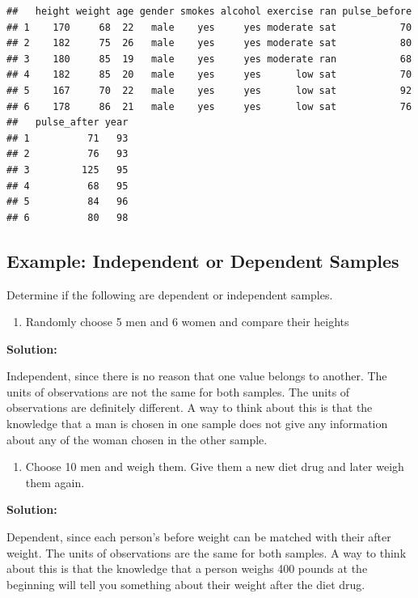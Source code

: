 \documentclass[]{book}
\providecommand{\tightlist}{%
  \setlength{\itemsep}{0pt}\setlength{\parskip}{0pt}}
\begin{document}
\begin{verbatim}
##   height weight age gender smokes alcohol exercise ran pulse_before
## 1    170     68  22   male    yes     yes moderate sat           70
## 2    182     75  26   male    yes     yes moderate sat           80
## 3    180     85  19   male    yes     yes moderate ran           68
## 4    182     85  20   male    yes     yes      low sat           70
## 5    167     70  22   male    yes     yes      low sat           92
## 6    178     86  21   male    yes     yes      low sat           76
##   pulse_after year
## 1          71   93
## 2          76   93
## 3         125   95
## 4          68   95
## 5          84   96
## 6          80   98
\end{verbatim}

\hypertarget{example-independent-or-dependent-samples}{%
\subsection{Example: Independent or Dependent Samples}\label{example-independent-or-dependent-samples}}

Determine if the following are dependent or independent samples.

\begin{enumerate}
\def\labelenumi{\alph{enumi}.}
\tightlist
\item
  Randomly choose 5 men and 6 women and compare their heights
\end{enumerate}

\textbf{Solution:}

Independent, since there is no reason that one value belongs to another. The units of observations are not the same for both samples. The units of observations are definitely different. A way to think about this is that the knowledge that a man is chosen in one sample does not give any information about any of the woman chosen in the other sample.

\begin{enumerate}
\def\labelenumi{\alph{enumi}.}
\setcounter{enumi}{1}
\tightlist
\item
  Choose 10 men and weigh them. Give them a new diet drug and later weigh them again.
\end{enumerate}

\textbf{Solution:}

Dependent, since each person's before weight can be matched with their after weight. The units of observations are the same for both samples. A way to think about this is that the knowledge that a person weighs 400 pounds at the beginning will tell you something about their weight after the diet drug.
\end{document}

